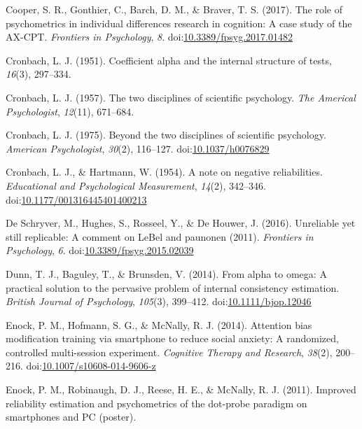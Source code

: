 \documentclass[english,,man,floatsintext]{apa6}
\begin{document}
\leavevmode\hypertarget{ref-cooper_role_2017}{}%
Cooper, S. R., Gonthier, C., Barch, D. M., \& Braver, T. S. (2017). The role of psychometrics in individual differences research in cognition: A case study of the AX-CPT. \emph{Frontiers in Psychology}, \emph{8}. doi:\href{https://doi.org/10.3389/fpsyg.2017.01482}{10.3389/fpsyg.2017.01482}

\leavevmode\hypertarget{ref-cronbach_l._j._coefficient_1951}{}%
Cronbach, L. J. (1951). Coefficient alpha and the internal structure of tests, \emph{16}(3), 297--334.

\leavevmode\hypertarget{ref-cronbach_two_1957}{}%
Cronbach, L. J. (1957). The two disciplines of scientific psychology. \emph{The Americal Psychologist}, \emph{12}(11), 671--684.

\leavevmode\hypertarget{ref-cronbach_beyond_1975}{}%
Cronbach, L. J. (1975). Beyond the two disciplines of scientific psychology. \emph{American Psychologist}, \emph{30}(2), 116--127. doi:\href{https://doi.org/10.1037/h0076829}{10.1037/h0076829}

\leavevmode\hypertarget{ref-cronbach_note_1954}{}%
Cronbach, L. J., \& Hartmann, W. (1954). A note on negative reliabilities. \emph{Educational and Psychological Measurement}, \emph{14}(2), 342--346. doi:\href{https://doi.org/10.1177/001316445401400213}{10.1177/001316445401400213}

\leavevmode\hypertarget{ref-de_schryver_unreliable_2016}{}%
De Schryver, M., Hughes, S., Rosseel, Y., \& De Houwer, J. (2016). Unreliable yet still replicable: A comment on LeBel and paunonen (2011). \emph{Frontiers in Psychology}, \emph{6}. doi:\href{https://doi.org/10.3389/fpsyg.2015.02039}{10.3389/fpsyg.2015.02039}

\leavevmode\hypertarget{ref-dunn_alpha_2014}{}%
Dunn, T. J., Baguley, T., \& Brunsden, V. (2014). From alpha to omega: A practical solution to the pervasive problem of internal consistency estimation. \emph{British Journal of Psychology}, \emph{105}(3), 399--412. doi:\href{https://doi.org/10.1111/bjop.12046}{10.1111/bjop.12046}

\leavevmode\hypertarget{ref-enock_attention_2014}{}%
Enock, P. M., Hofmann, S. G., \& McNally, R. J. (2014). Attention bias modification training via smartphone to reduce social anxiety: A randomized, controlled multi-session experiment. \emph{Cognitive Therapy and Research}, \emph{38}(2), 200--216. doi:\href{https://doi.org/10.1007/s10608-014-9606-z}{10.1007/s10608-014-9606-z}

\leavevmode\hypertarget{ref-enock_improved_2011}{}%
Enock, P. M., Robinaugh, D. J., Reese, H. E., \& McNally, R. J. (2011). Improved reliability estimation and psychometrics of the dot-probe paradigm on smartphones and PC (poster).
\end{document}
